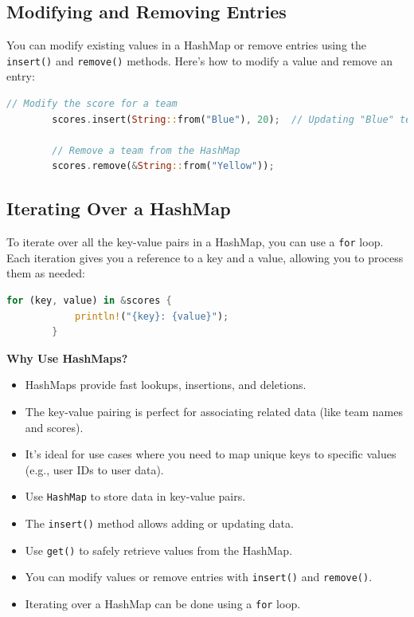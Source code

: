 \documentclass[a4paper,12pt]{report}
\begin{document}
	\subsection*{Modifying and Removing Entries}
	
	You can modify existing values in a HashMap or remove entries using the \texttt{insert()} and \texttt{remove()} methods. Here’s how to modify a value and remove an entry:
	
	\begin{lstlisting}[language=Rust]
		// Modify the score for a team
		scores.insert(String::from("Blue"), 20);  // Updating "Blue" team's score
		
		// Remove a team from the HashMap
		scores.remove(&String::from("Yellow"));
	\end{lstlisting}
	
	\subsection*{Iterating Over a HashMap}
	
	To iterate over all the key-value pairs in a HashMap, you can use a \texttt{for} loop. Each iteration gives you a reference to a key and a value, allowing you to process them as needed:
	
	\begin{lstlisting}[language=Rust]
		for (key, value) in &scores {
			println!("{key}: {value}");
		}
	\end{lstlisting}
	
	\noindent\textbf{Why Use HashMaps?}
	\begin{itemize}
		\item HashMaps provide fast lookups, insertions, and deletions.
		\item The key-value pairing is perfect for associating related data (like team names and scores).
		\item It’s ideal for use cases where you need to map unique keys to specific values (e.g., user IDs to user data).
	\end{itemize}
	
	\begin{takeawaybox}
		
		\begin{itemize}
			\item Use \texttt{HashMap} to store data in key-value pairs.
			\item The \texttt{insert()} method allows adding or updating data.
			\item Use \texttt{get()} to safely retrieve values from the HashMap.
			\item You can modify values or remove entries with \texttt{insert()} and \texttt{remove()}.
			\item Iterating over a HashMap can be done using a \texttt{for} loop.
		\end{itemize}
	\end{takeawaybox}
	
\end{document}
